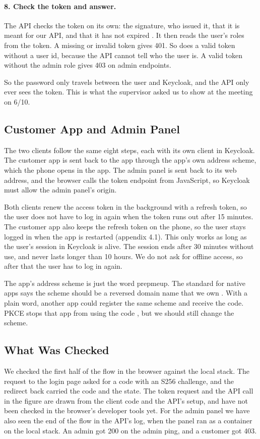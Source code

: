 \documentclass[a4paper,11pt]{article}
\begin{document}
\paragraph{8. Check the token and answer.} The API checks the token on its own: the signature, who issued it, that it is meant for our API, and that it has not expired \cite{ietf-rfc7519-jwt}. It then reads the user's roles from the token. A missing or invalid token gives 401. So does a valid token without a user id, because the API cannot tell who the user is. A valid token without the admin role gives 403 on admin endpoints.

So the password only travels between the user and Keycloak, and the API only ever sees the token. This is what the supervisor asked us to show at the meeting on 6/10.

\subsection{Customer App and Admin Panel}
The two clients follow the same eight steps, each with its own client in Keycloak. The customer app is sent back to the app through the app's own address scheme, which the phone opens in the app. The admin panel is sent back to its web address, and the browser calls the token endpoint from JavaScript, so Keycloak must allow the admin panel's origin.

Both clients renew the access token in the background with a refresh token, so the user does not have to log in again when the token runs out after 15 minutes. The customer app also keeps the refresh token on the phone, so the user stays logged in when the app is restarted (appendix 4.1). This only works as long as the user's session in Keycloak is alive. The session ends after 30 minutes without use, and never lasts longer than 10 hours. We do not ask for offline access, so after that the user has to log in again.

The app's address scheme is just the word prepmeup. The standard for native apps says the scheme should be a reversed domain name that we own \cite[sec.~7.1]{ietf-rfc8252-native-apps}. With a plain word, another app could register the same scheme and receive the code. PKCE stops that app from using the code \cite[sec.~8.1]{ietf-rfc8252-native-apps}, but we should still change the scheme.

\subsection{What Was Checked}
We checked the first half of the flow in the browser against the local stack. The request to the login page asked for a code with an S256 challenge, and the redirect back carried the code and the state. The token request and the API call in the figure are drawn from the client code and the API's setup, and have not been checked in the browser's developer tools yet. For the admin panel we have also seen the end of the flow in the API's log, when the panel ran as a container on the local stack. An admin got 200 on the admin ping, and a customer got 403.
\end{document}
